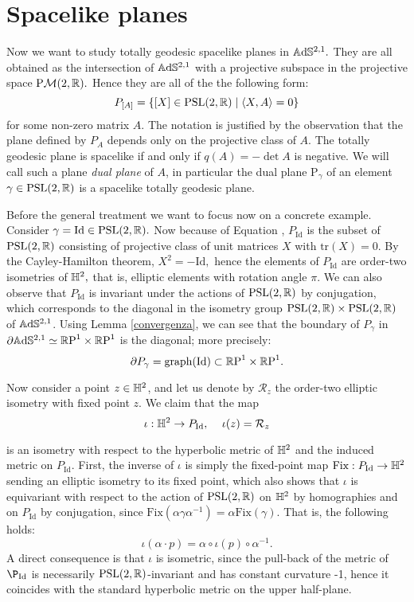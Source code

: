 \section{Spacelike planes}
Now we want to study totally geodesic spacelike planes in $\mathbb{A}\mathrm{d}\mathbb{S}^{2,1}.$ They are all obtained as the intersection of $\mathbb{A}\mathrm{d}\mathbb{S}^{2,1}$ with a projective subspace in the projective space $\text{P}\mathcal{M}(2,\mathbb{R}).$ Hence they are all of the the following form: 
\begin{equation}\label{geoplanes}
    P_{[A]}=\{[X]\in\text{PSL}(2,\mathbb{R})\;|\;\langle X,A\rangle=0\}
\end{equation}
for some non-zero matrix $A$. The notation is justified by the observation that the plane defined by $P_A$ depends only on the projective class of $A$. The totally geodesic plane is spacelike if and only if $q(A)=-\det A$ is negative. We will call such a plane \textit{dual plane} of $A$, in particular the dual plane $\text{P}_\gamma$  of an element $\gamma\in\text{PSL}(2,\mathbb{R})$ is a spacelike totally geodesic plane. \\
\begin{example}\label{spacelikeisometry}
Before the general treatment we want to focus now on a concrete example. Consider $\gamma=\text{Id}\in\text{PSL}(2,\mathbb{R}).$ Now because of Equation , $P_{\text{Id}}$ is the subset of $\text{PSL}(2,\mathbb{R})$ consisting of projective class of unit matrices $X$ with $\text{tr}(X)=0$. By the Cayley-Hamilton theorem, $X^2=-\text{Id},$ hence the elements of $P_{\text{Id}}$ are order-two isometries of $\mathbb{H}^2,$ that is, elliptic elements with rotation angle $\pi$.  We can also observe that $P_{\text{Id}}$ is invariant under the actions of $\text{PSL}(2,\mathbb{R})$ by conjugation, which corresponds to the diagonal in the isometry group $\text{PSL}(2,\mathbb{R})\times\text{PSL}(2,\mathbb{R})$ of $\mathbb{A}\mathrm{d}\mathbb{S}^{2,1}$. Using Lemma \ref{convergenza}, we can see that the boundary of $P_\gamma$ in $\partial\mathbb{A}\mathrm{d}\mathbb{S}^{2,1}\simeq \mathbb{R}\text{P}^1\times\mathbb{R}\text{P}^1$ is the diagonal; more precisely: 
\begin{equation}\label{graphino}
    \partial P_\gamma=\text{graph(Id)}\subset \mathbb{R}\text{P}^1\times\mathbb{R}\text{P}^1.
\end{equation}

Now consider a point $z\in\mathbb{H}^2$, and let us denote by $\mathcal{R}_z$ the order-two elliptic isometry with fixed point $z$. We claim that the map 
\[
    \iota:\mathbb{H}^2\to P_{\text{Id}},\;\;\;\ \iota(z)=\mathcal{R}_z
\]

is an isometry with respect to the hyperbolic metric of $\mathbb{H}^2$ and the induced metric on $P_{\text{Id}}.$ First, the inverse of $\iota$ is simply the fixed-point map $\text{Fix}:P_{\text{Id}}\to\mathbb{H}^2$ sending an elliptic isometry to its fixed point, which also shows that $\iota$ is equivariant with respect to the action of $\text{PSL}(2,\mathbb{R})$ on $\mathbb{H}^2$ by homographies and on $P_\text{Id}$ by conjugation, since $\text{Fix}(\alpha\gamma\alpha^{-1})=\alpha\text{Fix}(\gamma).$ That is, the following holds: 
\begin{equation}
    \iota(\alpha\cdot p)=\alpha\circ\iota(p)\circ\alpha^{-1}.
\end{equation} 
A direct consequence is that $\iota$ is isometric, since the pull-back of the metric of $\P_\text{Id}$ is necessarily $\text{PSL}(2,\mathbb{R})$-invariant and has constant curvature -1, hence it coincides with the standard hyperbolic metric on the upper half-plane.
\end{example}
